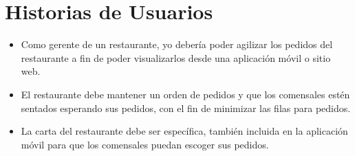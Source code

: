 \chapter{Historias de Usuarios}
\begin{itemize}
	\item Como gerente de un restaurante, yo debería poder agilizar los pedidos del restaurante a fin de poder visualizarlos desde una aplicación móvil o sitio web.
	\item El restaurante debe mantener un orden de pedidos y que los comensales estén sentados esperando sus pedidos, con el fin de minimizar las filas para pedidos.
	\item La carta del restaurante debe ser específica, también incluida en la aplicación móvil para que los comensales puedan escoger sus pedidos.
\end{itemize}